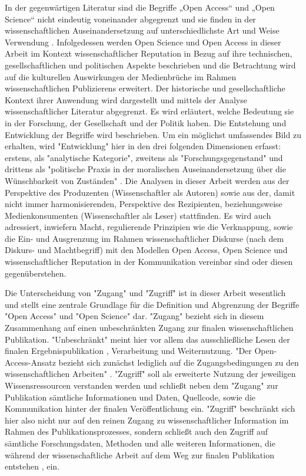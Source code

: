 In der gegenwärtigen Literatur sind die Begriffe „Open Access“ und „Open Science“ nicht eindeutig voneinander abgegrenzt und sie finden in der wissenschaftlichen Auseinandersetzung auf unterschiedlichste Art und Weise Verwendung \cite{cite:9}. Infolgedessen werden Open Science und Open Access in dieser Arbeit im Kontext wissenschaftlicher Reputation in Bezug auf ihre technischen, gesellschaftlichen und politischen Aspekte beschrieben und die Betrachtung wird auf die kulturellen Auswirkungen der Medienbrüche im Rahmen wissenschaftlichen Publizierens erweitert. Der historische und gesellschaftliche Kontext ihrer Anwendung wird dargestellt und mittels der Analyse wissenschaftlicher Literatur abgegrenzt. Es wird erläutert, welche Bedeutung sie in der Forschung, der Gesellschaft und der Politik haben. Die Entstehung und Entwicklung der Begriffe wird beschrieben. Um ein möglichst umfassendes Bild zu erhalten, wird "Entwicklung" hier in den drei folgenden Dimensionen erfasst: erstens, als "analytische Kategorie", zweitens als "Forschungsgegenstand" und drittens als "politische Praxis in der moralischen Auseinandersetzung über die Wünschbarkeit von Zuständen" \cite{cite:10}. Die Analysen in dieser Arbeit werden aus der Perspektive des Produzenten (Wissenschaftler als Autoren) sowie aus der, damit nicht immer harmonisierenden, Perspektive des Rezipienten, beziehungsweise Medienkonsumenten (Wissenschaftler als Leser) stattfinden. Es wird auch adressiert, inwiefern Macht, regulierende Prinzipien wie die Verknappung, sowie die Ein- und Ausgrenzung im Rahmen wissenschaftlicher Diskurse (nach dem Diskurs- und Machtbegriff) mit den Modellen Open Access, Open Science und wissenschaftlicher Reputation in der Kommunikation vereinbar sind oder diesen gegenüberstehen.

Die Unterscheidung von "Zugang" und "Zugriff" ist in dieser Arbeit wesentlich und stellt eine zentrale Grundlage für die Definition und Abgrenzung der Begriffe "Open Access" und "Open Science" dar. "Zugang" bezieht sich in diesem Zusammenhang auf einen unbeschränkten Zugang zur finalen wissenschaftlichen Publikation. "Unbeschränkt" meint hier vor allem das ausschließliche Lesen der finalen Ergebnispublikation \cite{cite:9a}, Verarbeitung und Weiternutzung. "Der Open-Access-Ansatz bezieht sich zunächst lediglich auf die Zugangsbedingungen zu den wissenschaftlichen Arbeiten" \cite{muller_2010_open}. "Zugriff" soll als erweiterte Nutzung der jeweiligen Wissensressourcen verstanden werden und schließt neben dem "Zugang" zur Publikation sämtliche Informationen und Daten, Quellcode, sowie die Kommunikation hinter der finalen Veröffentlichung \cite{cite:9b} \cite{hey_2015_open} ein. "Zugriff" beschränkt sich hier also nicht nur auf den reinen Zugang zu wissenschaftlicher Information im Rahmen des Publikationsprozesses, sondern schließt auch den Zugriff auf sämtliche Forschungsdaten, Methoden und alle weiteren Informationen, die während der wissenschaftliche Arbeit auf dem Weg zur finalen Publikation entstehen \cite{cite:9c}, ein.

